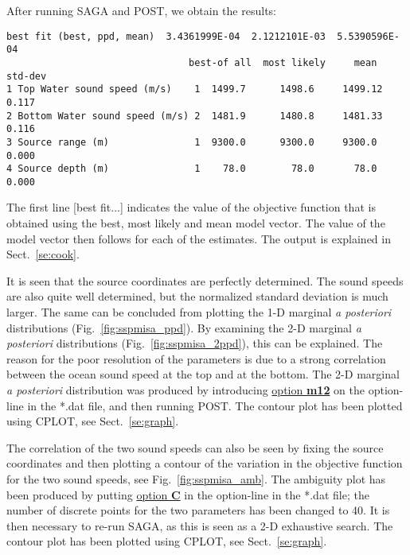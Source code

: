\documentclass{saclantc}
\begin{document}
After running {\sf SAGA} and {\sf POST}, we obtain the results: 


\small
\begin{verbatim}
best fit (best, ppd, mean)  3.4361999E-04  2.1212101E-03  5.5390596E-04
                                best-of all  most likely     mean   std-dev
1 Top Water sound speed (m/s)    1  1499.7      1498.6     1499.12    0.117
2 Bottom Water sound speed (m/s) 2  1481.9      1480.8     1481.33    0.116
3 Source range (m)               1  9300.0      9300.0     9300.0     0.000
4 Source depth (m)               1    78.0        78.0       78.0     0.000
\end{verbatim}
\normalsize
The first line [best fit...]
 indicates the  value of the objective function that
is obtained using the best, most likely and mean model vector. The
value of the model vector then follows for each of the estimates. The
output is explained in Sect.\ \ref{se:cook}.

It is seen that the source coordinates are perfectly determined. The
sound speeds are also quite well determined, but the normalized
standard deviation is much larger. The same can be concluded from 
plotting the 1-D marginal {\it a posteriori} distributions (Fig.\ 
\ref{fig:sspmisa_ppd}). By examining the 2-D 
marginal {\it a posteriori} distributions (Fig.\ 
\ref{fig:sspmisa_2ppd}), this can be explained.
The reason for the poor resolution of the parameters is due to a
strong correlation between the ocean sound speed at the top and at the bottom.
The  2-D marginal {\it a posteriori} distribution was produced by introducing
\underline{option {\bf m12}} 
on the option-line in the *.dat file, and then running
{\sf POST}. The contour plot has been plotted using {\sf CPLOT}, see
Sect.~\ref{se:graph}.

The correlation of the two sound speeds can also be seen by fixing the
source coordinates and then plotting a contour of the variation in
the objective function for the two sound speeds, see Fig.\
\ref{fig:sspmisa_amb}. The ambiguity plot has been produced by putting
\underline{option {\bf C}} in the option-line in the *.dat file;
the number of discrete points for the two parameters has been changed
to 40.  It is then necessary to re-run {\sf SAGA}, as this is seen as a 2-D
exhaustive search. The contour plot has been plotted using {\sf CPLOT}, see
Sect.~\ref{se:graph}.
\end{document}
